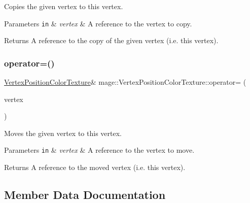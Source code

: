 Copies the given vertex to this vertex.


\begin{DoxyParams}[1]{Parameters}
\mbox{\tt in}  & {\em vertex} & A reference to the vertex to copy. \\
\hline
\end{DoxyParams}
\begin{DoxyReturn}{Returns}
A reference to the copy of the given vertex (i.\+e. this vertex). 
\end{DoxyReturn}
\hypertarget{structmage_1_1_vertex_position_color_texture_a7f3b2f23f7ed7f4d228f352fb1e53bcd}{}\label{structmage_1_1_vertex_position_color_texture_a7f3b2f23f7ed7f4d228f352fb1e53bcd} 
\subsubsection{\texorpdfstring{operator=()}{operator=()}\hspace{0.1cm}{\footnotesize\ttfamily [2/2]}}
{\footnotesize\ttfamily \hyperlink{structmage_1_1_vertex_position_color_texture}{Vertex\+Position\+Color\+Texture}\& mage\+::\+Vertex\+Position\+Color\+Texture\+::operator= (\begin{DoxyParamCaption}\item[{\hyperlink{structmage_1_1_vertex_position_color_texture}{Vertex\+Position\+Color\+Texture} \&\&}]{vertex }\end{DoxyParamCaption})\hspace{0.3cm}{\ttfamily [default]}}

Moves the given vertex to this vertex.


\begin{DoxyParams}[1]{Parameters}
\mbox{\tt in}  & {\em vertex} & A reference to the vertex to move. \\
\hline
\end{DoxyParams}
\begin{DoxyReturn}{Returns}
A reference to the moved vertex (i.\+e. this vertex). 
\end{DoxyReturn}


\subsection{Member Data Documentation}
\hypertarget{structmage_1_1_vertex_position_color_texture_afb9ec100ec42e83e501448d4bb0ee4f8}{}\label{structmage_1_1_vertex_position_color_texture_afb9ec100ec42e83e501448d4bb0ee4f8} 
